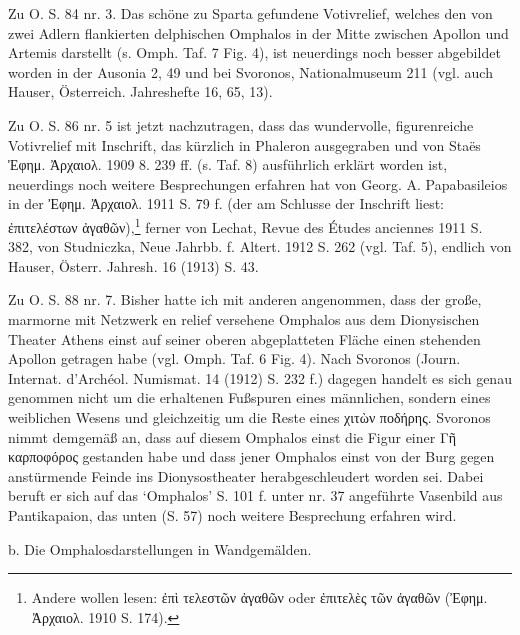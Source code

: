 \documentclass[a4paper, 11pt, oneside]{article}
\begin{document}
Zu O. S. 84 nr. 3. Das schöne zu Sparta gefundene Votivrelief, welches den von zwei Adlern flankierten delphischen Omphalos in der Mitte zwischen Apollon und Artemis darstellt (s. Omph. Taf. 7 Fig. 4), ist neuerdings noch besser abgebildet worden in der Ausonia 2, 49 und bei Svoronos, Nationalmuseum 211 (vgl. auch Hauser, Österreich. Jahreshefte 16, 65, 13).

Zu O. S. 86 nr. 5 ist jetzt nachzutragen, dass das wundervolle, figurenreiche Votivrelief mit Inschrift, das kürzlich in Phaleron ausgegraben und von Staës Ἐφημ. Ἀρχαιολ. 1909 8. 239 ff. (s. Taf. 8) ausführlich erklärt worden ist, neuerdings noch weitere Besprechungen erfahren hat von Georg. A. Papabasileios in der Ἐφημ. Ἀρχαιολ. 1911 S. 79 f. (der am Schlusse der Inschrift liest: ἐπιτελέστων ἀγαθῶν),\footnote{Andere wollen lesen: ἐπὶ τελεστῶν ἀγαθῶν oder ἐπιτελὲς τῶν ἀγαθῶν (Ἐφημ. Ἀρχαιολ. 1910 S. 174).} ferner von Lechat, Revue des Études anciennes 1911 S. 382, von Studniczka, Neue Jahrbb. f. Altert. 1912 S. 262 (vgl. Taf. 5), endlich von Hauser, Österr. Jahresh. 16 (1913) S. 43.

Zu O. S. 88 nr. 7. Bisher hatte ich mit anderen angenommen, dass der große, marmorne mit Netzwerk en relief versehene Omphalos aus dem Dionysischen Theater Athens einst auf seiner oberen abgeplatteten Fläche einen stehenden Apollon getragen habe (vgl. Omph. Taf. 6 Fig. 4). Nach Svoronos (Journ. Internat. d'Archéol. Numismat. 14 (1912) S. 232 f.) dagegen handelt es sich genau genommen nicht um die erhaltenen Fußspuren eines männlichen, sondern eines weiblichen Wesens und gleichzeitig um die Reste eines χιτὼν ποδήρης. Svoronos nimmt demgemäß an, dass auf diesem Omphalos einst die Figur einer Γῆ καρποφόρος gestanden habe und dass jener Omphalos einst von der Burg gegen anstürmende Feinde ins Dionysostheater herabgeschleudert worden sei. Dabei beruft er sich auf das `Omphalos' S. 101 f. unter nr. 37 angeführte Vasenbild aus Pantikapaion, das unten (S. 57) noch weitere Besprechung erfahren wird.
\begin{center}
b. Die Omphalosdarstellungen in Wandgemälden.
\end{center}
\end{document}
